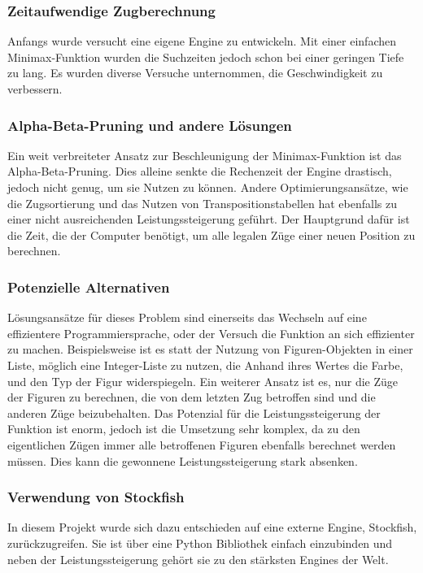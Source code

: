 \subsubsection{Zeitaufwendige Zugberechnung}
Anfangs wurde versucht eine eigene Engine zu entwickeln. Mit einer einfachen Minimax-Funktion wurden die Suchzeiten jedoch schon bei einer geringen Tiefe 
zu lang. Es wurden diverse Versuche unternommen, die Geschwindigkeit zu verbessern.

\subsubsection{Alpha-Beta-Pruning und andere Lösungen}
Ein weit verbreiteter Ansatz zur Beschleunigung der Minimax-Funktion ist das Alpha-Beta-Pruning. Dies alleine senkte die Rechenzeit der Engine drastisch, jedoch nicht genug,
um sie Nutzen zu können. Andere Optimierungsansätze, wie die Zugsortierung und das Nutzen von Transpositionstabellen hat ebenfalls zu einer nicht ausreichenden 
Leistungssteigerung geführt. Der Hauptgrund dafür ist die Zeit, die der Computer benötigt, um alle legalen Züge einer neuen Position zu berechnen.

\subsubsection{Potenzielle Alternativen}
Lösungsansätze für dieses Problem sind einerseits das Wechseln auf eine effizientere Programmiersprache, oder der Versuch die Funktion an sich effizienter zu machen. 
Beispielsweise ist es statt der Nutzung von Figuren-Objekten in einer Liste, möglich eine Integer-Liste zu nutzen, 
die Anhand ihres Wertes die Farbe, und den Typ der Figur widerspiegeln. Ein weiterer Ansatz ist es, nur die Züge der Figuren zu berechnen, die von dem letzten Zug betroffen 
sind und die anderen Züge beizubehalten. Das Potenzial für die Leistungssteigerung der Funktion ist enorm, jedoch ist die Umsetzung sehr komplex, da zu den eigentlichen Zügen
immer alle betroffenen Figuren ebenfalls berechnet werden müssen. Dies kann die gewonnene Leistungssteigerung stark absenken.

\subsubsection{Verwendung von Stockfish}
In diesem Projekt wurde sich dazu entschieden auf eine externe Engine, Stockfish, zurückzugreifen. Sie ist über eine Python Bibliothek einfach einzubinden und
neben der Leistungssteigerung gehört sie zu den stärksten Engines der Welt.

